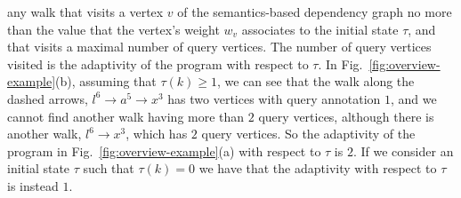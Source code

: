 any  walk  that visits a vertex $v$ of the semantics-based dependency graph no more than the value that the vertex's weight $w_v$ associates to the initial state $\tau$, and that visits a maximal number of query vertices.
The number of query vertices visited is the adaptivity of the program with respect to $\tau$.
In Fig.~\ref{fig:overview-example}(b), assuming that $\tau(k) \geq 1$, we can see that the 
walk along the dashed arrows,  $l^{6} \to a^5 \to x^3 $ has two vertices with query annotation $1$, and we cannot find another walk having more than $2$ query vertices, although there is another walk, $l^{6} \to x^3 $, which has $2$ query vertices. So the adaptivity of the program in Fig.~\ref{fig:overview-example}(a) with respect to $\tau$ is $2$. If we consider an initial state $\tau$ such that $\tau(k)=0$ we have that the adaptivity with respect to $\tau$ is instead $1$. 

